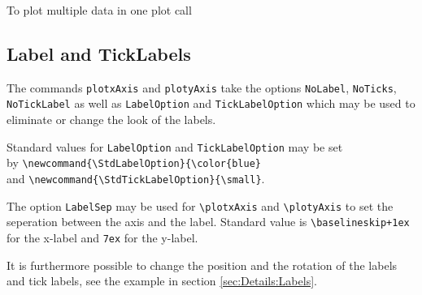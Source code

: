 \begin{minipage}[T]{0.45\linewidth}
	
\end{minipage}
\hspace{0.05\linewidth}
\begin{minipage}[T]{0.45\linewidth}
	
\end{minipage}

To plot multiple data in one plot call

\begin{minipage}[T]{0.45\linewidth}
	
\end{minipage}
\hspace{0.05\linewidth}
\begin{minipage}[T]{0.45\linewidth}
	\centering
	
\end{minipage}


\subsection{Label and TickLabels}

The commands \texttt{plotxAxis} and \texttt{plotyAxis} take the options
\texttt{NoLabel}, \texttt{NoTicks}, \texttt{NoTickLabel} as well as
\texttt{LabelOption} and \texttt{TickLabelOption} which may be used to eliminate
or change the look of the labels.

Standard values for \texttt{LabelOption} and \texttt{TickLabelOption} may be set\\
by \verb|\newcommand{\StdLabelOption}{\color{blue}|\\
and \verb|\newcommand{\StdTickLabelOption}{\small}|.

The option \texttt{LabelSep} may be used for \verb|\plotxAxis| and
\verb|\plotyAxis| to set the seperation between the axis and the label. Standard
value is \verb|\baselineskip+1ex| for the x-label and \verb|7ex| for the
y-label.

\begin{minipage}[T]{0.45\linewidth}
	
\end{minipage}
\hspace{0.05\linewidth}
\begin{minipage}[T]{0.45\linewidth}
	
\end{minipage}

It is furthermore possible to change the position and the rotation of the labels
and tick labels, see the example in section \ref{sec:Details:Labels}.

